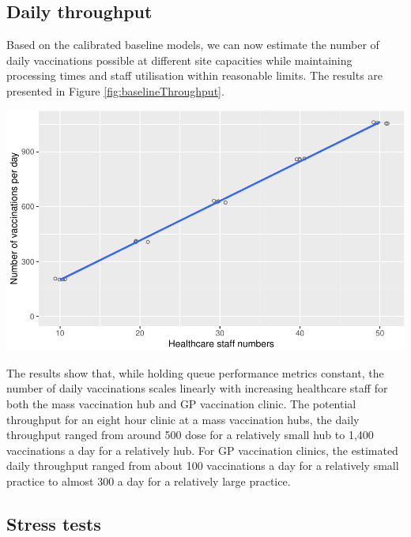 \documentclass{article}
\let\origfigure\figure
\let\endorigfigure\endfigure
\renewenvironment{figure}[1][2] {
    \expandafter\origfigure\expandafter[H]
} {
    \endorigfigure
}
\begin{document}
\hypertarget{daily-throughput}{%
\subsection{Daily throughput}\label{daily-throughput}}

Based on the calibrated baseline models, we can now estimate the number
of daily vaccinations possible at different site capacities while
maintaining processing times and staff utilisation within reasonable
limits. The results are presented in Figure
\ref{fig:baselineThroughput}.

\begin{figure}

{\centering \includegraphics{Preprint_files/figure-latex/baselineThroughput-1} 

}

\caption{Baseline processing time for mass vaccination hubs (A) and GP vaccination clinics (B)}\label{fig:baselineThroughput}
\end{figure}

The results show that, while holding queue performance metrics constant,
the number of daily vaccinations scales linearly with increasing
healthcare staff for both the mass vaccination hub and GP vaccination
clinic. The potential throughput for an eight hour clinic at a mass
vaccination hubs, the daily throughput ranged from around 500 dose for a
relatively small hub to 1,400 vaccinations a day for a relatively hub.
For GP vaccination clinics, the estimated daily throughput ranged from
about 100 vaccinations a day for a relatively small practice to almost
300 a day for a relatively large practice.

\hypertarget{stress-tests}{%
\subsection{Stress tests}\label{stress-tests}}
\end{document}
